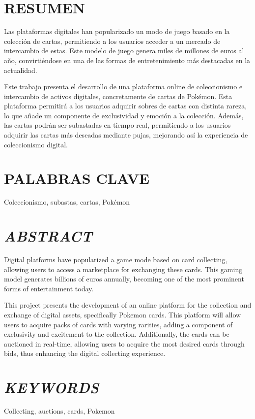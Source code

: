 \section{RESUMEN}
Las plataformas digitales han popularizado un modo de juego basado en la colección de cartas, permitiendo a los usuarios acceder a un mercado de intercambio de estas. 
Este modelo de juego genera miles de millones de euros al año, convirtiéndose en una de las formas de entretenimiento más destacadas en la actualidad.

Este trabajo presenta el desarrollo de una plataforma online de coleccionismo e intercambio de activos digitales, concretamente de cartas de Pokémon.
Esta plataforma permitirá a los usuarios adquirir sobres de cartas con distinta rareza, lo que añade un componente de exclusividad y emoción a la colección. 
Además, las cartas podrán ser subastadas en tiempo real, permitiendo a los usuarios adquirir las cartas más deseadas mediante pujas, mejorando así la experiencia de coleccionismo digital.

\section{PALABRAS CLAVE}
Coleccionismo, subastas, cartas, Pokémon

\section{\textit{ABSTRACT}}
Digital platforms have popularized a game mode based on card collecting, allowing users to access a marketplace for exchanging these cards. 
This gaming model generates billions of euros annually, becoming one of the most prominent forms of entertainment today.

This project presents the development of an online platform for the collection and exchange of digital assets, 
specifically Pokemon cards.
This platform will allow users to acquire packs of cards with varying rarities, 
adding a component of exclusivity and excitement to the collection. Additionally, the cards can be auctioned in real-time, 
allowing users to acquire the most desired cards through bids, thus enhancing the digital collecting experience.

\section{\textit{KEYWORDS}}
Collecting, auctions, cards, Pokemon
